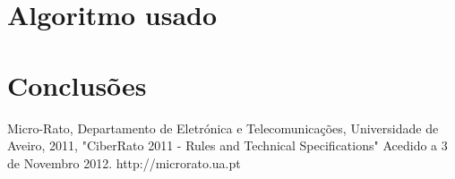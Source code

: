 \documentclass[citeauthoryear]{llncs} %
\begin{document}
\section{Algoritmo usado}

\section{Conclusões}

\begingroup
\renewcommand\refname{Referências}
\begin{thebibliography}{}

Micro-Rato, Departamento de Eletrónica e Telecomunicações, Universidade de Aveiro, 2011, "CiberRato 2011 - Rules and Technical Specifications" Acedido a 3 de Novembro 2012. http://microrato.ua.pt
\end{thebibliography}
\endgroup
\end{document}
